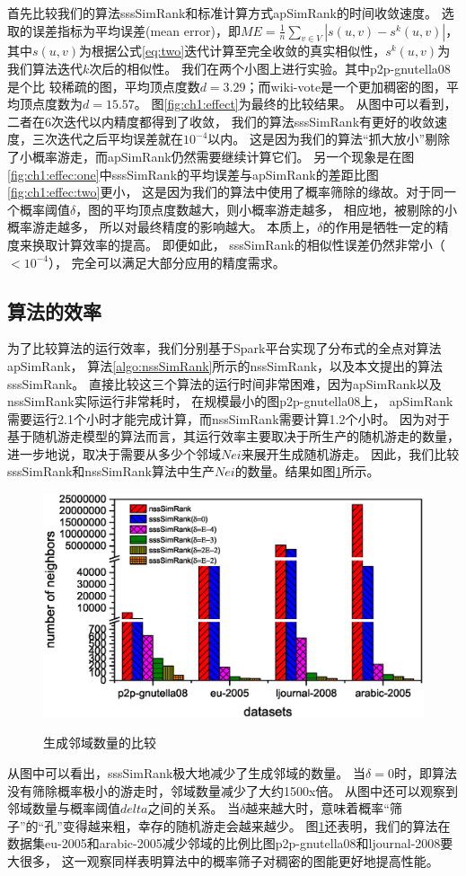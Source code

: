 \documentclass[master]{njuthesis}
\begin{document}
首先比较我们的算法sssSimRank和标准计算方式apSimRank的时间收敛速度。
选取的误差指标为平均误差(mean error)，即$ME = \frac{1}{n}\sum_{v \in V}{\left|s(u,v) - s^k(u,v)\right|}$，
其中$s(u,v)$为根据公式\ref{eq:two}迭代计算至完全收敛的真实相似性，$s^k(u,v)$为我们算法迭代$k$次后的相似性。
我们在两个小图上进行实验。其中p2p-gnutella08是个比
较稀疏的图，平均顶点度数$d=3.29$；而wiki-vote是一个更加稠密的图，平均顶点度数为$d=15.57$。
图\ref{fig:ch1:effect}为最终的比较结果。
从图中可以看到，二者在6次迭代以内精度都得到了收敛， 我们的算法sssSimRank有更好的收敛速度，三次迭代之后平均误差就在$10^{-4}$以内。
这是因为我们的算法“抓大放小”剔除了小概率游走，而apSimRank仍然需要继续计算它们。
另一个现象是在图\ref{fig:ch1:effec:one}中sssSimRank的平均误差与apSimRank的差距比图\ref{fig:ch1:effec:two}更小，
这是因为我们的算法中使用了概率筛除的缘故。对于同一个概率阈值$\delta$，图的平均顶点度数越大，则小概率游走越多， 相应地，被剔除的小概率游走越多，
所以对最终精度的影响越大。 
本质上，$\delta$的作用是牺牲一定的精度来换取计算效率的提高。
即便如此， sssSimRank的相似性误差仍然非常小（$<10^{-4}$）， 完全可以满足大部分应用的精度需求。
\subsection{算法的效率}
为了比较算法的运行效率，我们分别基于Spark平台实现了分布式的全点对算法apSimRank， 算法\ref{algo:nssSimRank}所示的nssSimRank，以及本文提出的算法sssSimRank。
直接比较这三个算法的运行时间非常困难，因为apSimRank以及nssSimRank实际运行非常耗时，
在规模最小的图p2p-gnutella08上， apSimRank需要运行2.1个小时才能完成计算，而nssSimRank需要计算1.2个小时。
因为对于基于随机游走模型的算法而言，其运行效率主要取决于所生产的随机游走的数量，进一步地说，取决于需要从多少个邻域$Nei$来展开生成随机游走。
因此，我们比较sssSimRank和nssSimRank算法中生产$Nei$的数量。结果如图\ref{fig:ch1:runtime}所示。
\begin{figure}[h]
  \centering
  \includegraphics[width= 1\textwidth]{figure/neighborhoods.eps}\\
  \caption{生成邻域数量的比较}\label{fig:ch1:runtime}
\end{figure}
从图中可以看出，sssSimRank极大地减少了生成邻域的数量。
当$\delta=0$时，即算法没有筛除概率极小的游走时，邻域数量减少了大约1500x倍。
从图中还可以观察到邻域数量与概率阈值$delta$之间的关系。
当$\delta$越来越大时，意味着概率“筛子”的“孔”变得越来粗，幸存的随机游走会越来越少。
图\ref{fig:ch1:runtime}还表明，我们的算法在数据集eu-2005和arabic-2005减少邻域的比例比图p2p-gnutella08和ljournal-2008要大很多，
这一观察同样表明算法中的概率筛子对稠密的图能更好地提高性能。
\end{document}
